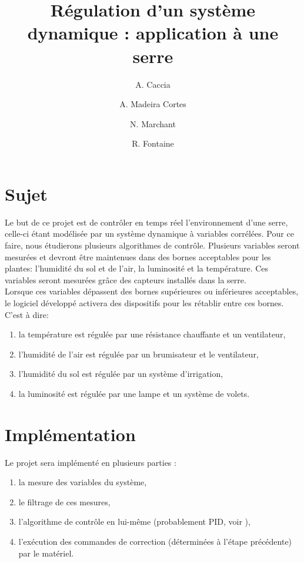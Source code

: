 \documentclass[a4paper,10pt]{article}
\title{Régulation d'un système dynamique : application à une serre}
\author{A. Caccia \and A. Madeira Cortes \and N. Marchant \and R. Fontaine}
\date{ }
\begin{document}
\maketitle

\vspace{1cm}

\section{Sujet}

Le but de ce projet est de contrôler en temps réel l'environnement d'une serre, celle-ci étant modélisée par un système dynamique à variables corrélées. Pour ce faire, nous étudierons plusieurs algorithmes de contrôle. Plusieurs variables seront mesurées et devront être maintenues dans des bornes acceptables pour les plantes: l'humidité du sol et de l'air, la luminosité et la température. Ces variables seront mesurées grâce des capteurs installés dans la serre. \\

Lorsque ces variables dépassent des bornes supérieures ou inférieures acceptables, le logiciel développé activera des dispositifs pour les rétablir entre ces bornes. C'est à dire:

\begin{enumerate}
	\item la température est régulée par une résistance chauffante et un ventilateur,
	\item l'humidité de l'air est régulée par un brumisateur et le ventilateur,
	\item l'humidité du sol est régulée par un système d'irrigation,
	\item la luminosité est régulée par une lampe et un système de volets.\\
\end{enumerate}

\section{Implémentation}

Le projet sera implémenté en plusieurs parties :

\begin{enumerate}
    \item la mesure des variables du système,
    \item le filtrage de ces mesures,
    \item l'algorithme de contrôle en lui-même (probablement PID, voir \cite{Kinnaert2013}),
    \item l'exécution des commandes de correction (déterminées à l'étape précédente) par le matériel.\\
\end{enumerate}
\end{document}
